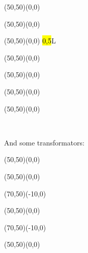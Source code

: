 	\begin{center}
	\begin{picture}(50,50)(0,0)
	\end{picture}
	\begin{picture}(50,50)(0,0)
	\end{picture}
	\begin{picture}(50,50)(0,0)
	\hl{0,5}{L}
	\end{picture}
	\begin{picture}(50,50)(0,0)
	\end{picture}
	\begin{picture}(50,50)(0,0)
	\end{picture}
	\begin{picture}(50,50)(0,0)
	\end{picture}
	\begin{picture}(50,50)(0,0)
	\end{picture}
	\\[2cm]
	\end{center}
	
	And some transformators:
	\vspace{1cm}
	\begin{center}
	\begin{picture}(50,50)(0,0)
	\end{picture}
	\begin{picture}(50,50)(0,0)
	\end{picture}
	\begin{picture}(70,50)(-10,0)
	\end{picture}
	\begin{picture}(50,50)(0,0)
	\end{picture}
	\begin{picture}(70,50)(-10,0)
	\end{picture}
	\begin{picture}(50,50)(0,0)
	\end{picture}\hfill\\[1cm]
	\end{center}
	
